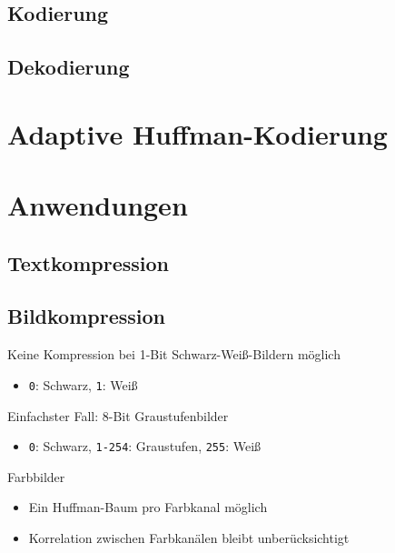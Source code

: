 \documentclass[xcolor=table,presentation]{beamer}    %
\newenvironment{witemize}{\itemize\setlength{\itemsep}{0.5em}}{\enditemize}
\begin{document}
\subsection{Kodierung}

\subsection{Dekodierung}

\section{Adaptive Huffman-Kodierung}

\section{Anwendungen}

\subsection{Textkompression}

\begin{frame}{\insertsubsection}

\end{frame}

\subsection{Bildkompression}

\begin{frame}{\insertsubsection}
\begin{witemize}
\item Keine Kompression bei 1-Bit Schwarz-Weiß-Bildern möglich
  \begin{itemize}
    \item {\tt0}: Schwarz, {\tt1}: Weiß
  \end{itemize}

\item Einfachster Fall: 8-Bit Graustufenbilder
  \begin{itemize}
    \item {\tt0}: Schwarz, {\tt1-254}: Graustufen, {\tt255}: Weiß
  \end{itemize}

\item Farbbilder
  \begin{itemize}
    \item Ein Huffman-Baum pro Farbkanal möglich
    \item Korrelation zwischen Farbkanälen bleibt unberücksichtigt
  \end{itemize}
\end{witemize}
\end{frame}
\end{document}
